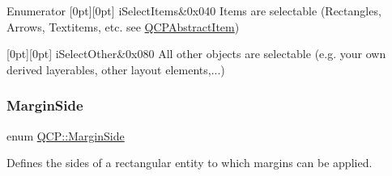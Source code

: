 \begin{DoxyEnumFields}{Enumerator}
[0pt][0pt]{}\mbox{\label{namespace_q_c_p_a2ad6bb6281c7c2d593d4277b44c2b037a271679ebb13ab4a6b4c2c2d9459f1de8}} 
i\+Select\+Items&{\ttfamily 0x040} Items are selectable (Rectangles, Arrows, Textitems, etc. see \hyperlink{class_q_c_p_abstract_item}{Q\+C\+P\+Abstract\+Item}) \\
\hline

[0pt][0pt]{}\mbox{\label{namespace_q_c_p_a2ad6bb6281c7c2d593d4277b44c2b037a2ba96f62595bc22603da0e575b589a83}} 
i\+Select\+Other&{\ttfamily 0x080} All other objects are selectable (e.\+g. your own derived layerables, other layout elements,...) \\
\hline

\end{DoxyEnumFields}
\mbox{\label{namespace_q_c_p_a7e487e3e2ccb62ab7771065bab7cae54}} 
\subsubsection{\texorpdfstring{Margin\+Side}{MarginSide}\hspace{0.1cm}{\footnotesize\ttfamily [1/2]}}
{\footnotesize\ttfamily enum \hyperlink{namespace_q_c_p_a7e487e3e2ccb62ab7771065bab7cae54}{Q\+C\+P\+::\+Margin\+Side}}

Defines the sides of a rectangular entity to which margins can be applied.

